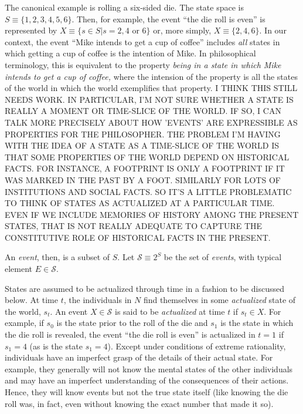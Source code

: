 \documentclass[
11pt,
titlepage,
reqno,
]{article}%
\theoremstyle{definition}
\begin{document}
	The canonical example is rolling a six-sided die. 
	The state space is $S\equiv\{1,2,3,4,5,6\}$. 
	Then, for example, the event ``the die roll is even'' is represented by $X\equiv\{s\in S|s=2,4\text{ or }6\}$ or, more simply, $X\equiv\{2,4,6\}$. 
	In our context, the event ``Mike intends to get a cup of coffee''  includes \textit{all} states in which getting a cup of coffee is the intention of Mike. 
	In philosophical terminology, this is equivalent to the property \textit{being in a state in which Mike intends to get a cup of coffee,} where the intension of the property is all the states of the world in which the world exemplifies that property. 
	I THINK THIS STILL NEEDS WORK. IN PARTICULAR, I'M NOT SURE WHETHER A STATE IS REALLY A MOMENT OR TIME-SLICE OF THE WORLD. IF SO, I CAN TALK MORE PRECISELY ABOUT HOW 'EVENTS' ARE EXPRESSIBLE AS PROPERTIES FOR THE PHILOSOPHER. THE PROBLEM I'M HAVING WITH THE IDEA OF A STATE AS A TIME-SLICE OF THE WORLD IS THAT SOME PROPERTIES OF THE WORLD DEPEND ON HISTORICAL FACTS. FOR INSTANCE, A FOOTPRINT IS ONLY A FOOTPRINT IF IT WAS MARKED IN THE PAST BY A FOOT. SIMILARLY FOR LOTS OF INSTITUTIONS AND SOCIAL FACTS. SO IT'S A LITTLE PROBLEMATIC TO THINK OF STATES AS ACTUALIZED AT A PARTICULAR TIME. EVEN IF WE INCLUDE MEMORIES OF HISTORY AMONG THE PRESENT STATES, THAT IS NOT REALLY ADEQUATE TO CAPTURE THE CONSTITUTIVE ROLE OF HISTORICAL FACTS IN THE PRESENT.
	
	An \textit{event}, then, is a subset of $S$.  
	Let $\mathcal{S}\equiv 2^S$ be the set of \textit{events}, with typical element $E\in \mathcal{S}$. 
	
	
	States are assumed to be actualized through time in a fashion to be discussed below. 
	At time $t$, the individuals in $N$ find themselves in some \textit{actualized} state of the world, $s_t$. 
	An event $X\in\mathcal{S}$ is said to be \textit{actualized} at time $t$ if $s_t\in X$. 
	For example, if $s_0$ is the state prior to the roll of the die and $s_1$ is the state in which the die roll is revealed, the event ``the die roll is even'' is actualized in $t=1$ if $s_1=4$ (as is the state $s_1=4$).
	Except under conditions of extreme rationality, individuals  have an imperfect grasp of the details of their actual state.
	For example, they generally will not know the mental states of the other individuals and may have an imperfect understanding of the consequences of their actions.
	Hence, they will know events but not the true state  itself (like knowing the die roll was, in fact, even without knowing the exact number that made it so).
	
\end{document}
